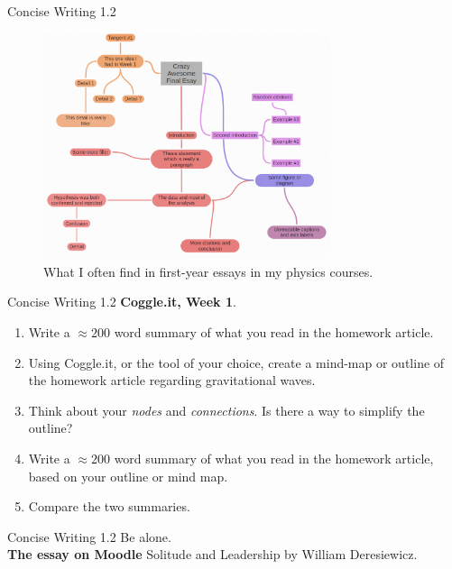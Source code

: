 \documentclass{beamer}
\begin{document}
\begin{frame}{Concise Writing 1.2}
\begin{figure}
\centering
\includegraphics[width=0.75\textwidth]{figures/MindMap3.png}
\caption{\label{fig:mm3} What I often find in first-year essays in my physics courses.}
\end{figure}
\end{frame}

\begin{frame}{Concise Writing 1.2}
\textbf{Coggle.it, Week 1}.
\begin{enumerate}
\item Write a $\approx 200$ word summary of what you read in the homework article.
\item Using Coggle.it, or the tool of your choice, create a mind-map or outline of the homework article regarding gravitational waves.
\item Think about your \textit{nodes} and \textit{connections}.  Is there a way to simplify the outline?
\item Write a $\approx 200$ word summary of what you read in the homework article, based on your outline or mind map.
\item Compare the two summaries.
\end{enumerate}
\end{frame}

\begin{frame}{Concise Writing 1.2}
\small
Be alone. \\ \vspace{0.5cm}
\alert{\textbf{The essay on Moodle} Solitude and Leadership} by William Deresiewicz.
\end{frame}
\end{document}
